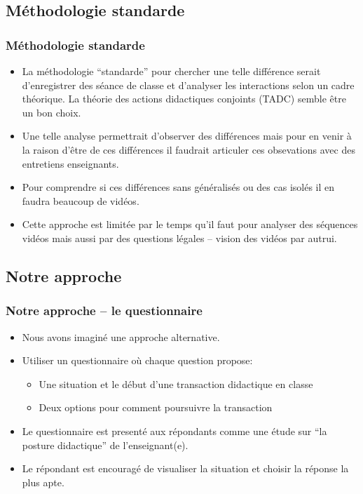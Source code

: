 \documentclass{beamer}
\begin{document}
\subsection{Méthodologie standarde}
\begin{frame}
\frametitle{Méthodologie standarde}
\begin{itemize}
\item La méthodologie ``standarde'' pour chercher une telle différence serait d'enregistrer des séance de classe et d'analyser
les interactions selon un cadre théorique. La théorie des actions didactiques conjoints (TADC) semble être un bon choix.
\item Une telle analyse permettrait d'observer des différences mais pour en venir à la raison d'être de ces différences il faudrait articuler ces obsevations avec des entretiens enseignants.
\item Pour comprendre si ces différences sans généralisés ou des cas isolés il en faudra beaucoup de vidéos.
\item Cette approche est limitée par le temps qu'il faut pour analyser des séquences vidéos mais aussi par des questions
légales -- vision des vidéos par autrui.  
\end{itemize}
\end{frame}

\subsection{Notre approche}
\begin{frame}
\frametitle{Notre approche -- le questionnaire}
\begin{itemize}
\item Nous avons imaginé une approche alternative.
\item Utiliser un questionnaire où chaque question propose:
  \begin{itemize}
   \item Une situation et le début d'une transaction didactique en classe
   \item Deux options pour comment poursuivre la transaction 
  \end{itemize}
\item Le questionnaire est presenté aux répondants comme une étude sur
  ``la posture didactique'' de l'enseignant(e).
\item Le répondant est encouragé de visualiser la situation et choisir la
  réponse la plus apte. 
\end{itemize}
\end{frame}
\end{document}
